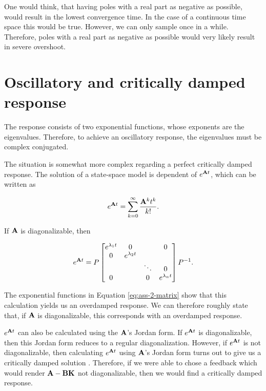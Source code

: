 \documentclass[11pt,titlepage]{report}
\begin{document}
One would think, that having poles with a real part as negative as possible, would result in the lowest convergence time. In the case of a continuous time space this would be true. However, we can only sample once in a while. Therefore, poles with a real part as negative as possible would very likely result in severe overshoot.

\section{Oscillatory and critically damped response}
\label{sec:ass-2-behav}
The response consists of two exponential functions, whose exponents are the eigenvalues. Therefore, to achieve an oscillatory response, the eigenvalues must be complex conjugated.

The situation is somewhat more complex regarding a perfect critically damped response. The solution of a state-space model is dependent of $e^{\mathbf{A} t}$, which can be written as

\begin{equation}
	e^{\mathbf{A} t} = \sum_{k=0}^{\infty} \frac{\mathbf{A}^k t^k}{k!}.
\end{equation}

If $\mathbf{A}$ is diagonalizable, then

\begin{equation} \label{eq:ass-2-matrix}
	e^{\mathbf{A} t} = P \begin{bmatrix}
		e^{\lambda_1 t} & 0 & & 0 \\
		0 & e^{\lambda_2 t} & & \\
		 & & \ddots & 0 \\
		 0 & & 0 & e^{\lambda_n t}
	\end{bmatrix} P^{-1}.
\end{equation}

The exponential functions in Equation \ref{eq:ass-2-matrix} show that this calculation yields us an overdamped response. We can therefore roughly state that, if $\mathbf{A}$ is diagonalizable, this corresponds with an overdamped response.

$e^{\mathbf{A} t}$ can also be calculated using the $\mathbf{A}$'s Jordan form. If $e^{\mathbf{A} t}$ is diagonalizable, then this Jordan form reduces to a regular diagonalization. However, if $e^{\mathbf{A} t}$ is not diagonalizable, then calculating $e^{\mathbf{A} t}$ using $\mathbf{A}$'s Jordan form turns out to give us a critically damped solution \cite{jordan-solution}. Therefore, if we were able to chose a feedback which would render $\mathbf{A} - \mathbf{B} \mathbf{K}$ not diagonalizable, then we would find a critically damped response.
\end{document}
